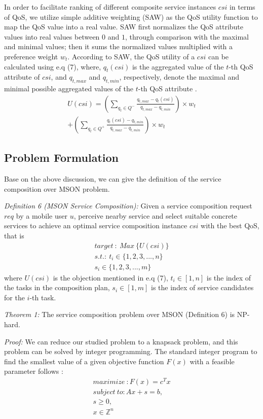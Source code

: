 \documentclass[10pt,journal,compsoc]{IEEEtran}
\begin{document}
In order to facilitate ranking of different composite service instances $csi$ in terms of QoS, we utilize simple additive weighting (SAW) as the QoS utility function to map the QoS value into a real value. SAW first normalizes the QoS attribute values into real values between $0$ and $1$, through comparison with the maximal and minimal values; then it sums the normalized values multiplied with a preference weight $w_t$. According to SAW, the QoS utility of a $csi$ can be calculated using e.q (7), where, $q_t(csi)$ is the aggregated value of the $t$-th QoS attribute of $csi$, and $q_{t,max}$ and $q_{t,min}$, respectively, denote the maximal and minimal possible aggregated values of the $t$-th QoS attribute \cite{Wu2016}.
\begin{eqnarray}
U(csi) = (\sum_{q_t \in Q^-} \frac{q_{t,max}-q_t(csi)}{q_{t,max}-q_{t,min}})\times w_t \\\nonumber
+(\sum_{q_t \in Q^+} \frac{q_t(csi)-q_{t,min}}{q_{t,max}-q_{t,min}})\times w_t
\end{eqnarray}

\subsection{Problem Formulation}
Base on the above discussion, we can give the definition of the service composition over MSON problem.

\textit{Definition 6 (MSON Service Composition):} Given a service composition request $req$ by a mobile user $u$, perceive nearby service and select suitable concrete services to achieve an optimal service composition instance $csi$ with the best QoS, that is
\begin{eqnarray}
target \ : \  Max \ \{U(csi)\}   \\\nonumber
s.t. : \ t_i \in \{1,2,3,...,n\}  \\\nonumber
s_i \in \{1,2,3,...,m \}
\end{eqnarray}
where $U(csi)$ is the objection mentioned in e.q (7), $t_i \in [1,n]$ is the index of the tasks in the composition plan, $s_i \in [1, m]$ is the index of service candidates for the $i$-th task.

\textit{Theorem 1:} The service composition problem over MSON (Definition 6) is NP-hard.

\textit{Proof:} We can reduce our studied problem to a knapsack problem, and this problem can be solved by integer programming. The standard integer program to find the smallest value of a given objective function $F(x)$ with a feasible parameter follows \cite{glover1986future}:
\begin{eqnarray}
maximize \  : F(x) = c^{T}x     \\\nonumber
subject \ to: Ax+s = b, \\
s \ge 0, \\
x \in \mathbb{Z}^{n}
\end{eqnarray}
\end{document}
